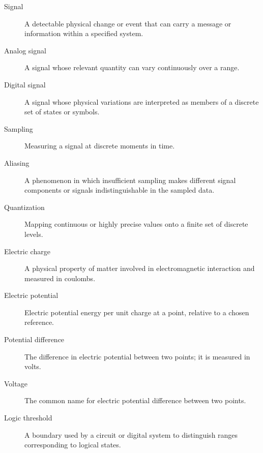 \begin{description}
  \item[Signal] A detectable physical change or event that can carry a message or information within a specified system.
  \item[Analog signal] A signal whose relevant quantity can vary continuously over a range.
  \item[Digital signal] A signal whose physical variations are interpreted as members of a discrete set of states or symbols.
  \item[Sampling] Measuring a signal at discrete moments in time.
  \item[Aliasing] A phenomenon in which insufficient sampling makes different signal components or signals indistinguishable in the sampled data.
  \item[Quantization] Mapping continuous or highly precise values onto a finite set of discrete levels.
  \item[Electric charge] A physical property of matter involved in electromagnetic interaction and measured in coulombs.
  \item[Electric potential] Electric potential energy per unit charge at a point, relative to a chosen reference.
  \item[Potential difference] The difference in electric potential between two points; it is measured in volts.
  \item[Voltage] The common name for electric potential difference between two points.
  \item[Logic threshold] A boundary used by a circuit or digital system to distinguish ranges corresponding to logical states.
\end{description}
